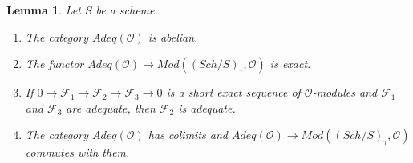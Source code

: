 \documentclass{stacks-project}
\theoremstyle{plain}
\newtheorem{lemma}[subsection]{Lemma}
\theoremstyle{definition}
\theoremstyle{remark}
\numberwithin{equation}{subsection}
\def\Sch{\mathit{Sch}}
\begin{document}
\begin{lemma}
\label{lemma-abelian-adequate}
Let $S$ be a scheme.
\begin{enumerate}
\item The category $\textit{Adeq}(\mathcal{O})$ is abelian.
\item The functor
$\textit{Adeq}(\mathcal{O}) \to
\textit{Mod}((\Sch/S)_\tau, \mathcal{O})$
is exact.
\item If $0 \to \mathcal{F}_1 \to \mathcal{F}_2 \to \mathcal{F}_3 \to 0$
is a short exact sequence of $\mathcal{O}$-modules and
$\mathcal{F}_1$ and $\mathcal{F}_3$ are adequate, then
$\mathcal{F}_2$ is adequate.
\item The category $\textit{Adeq}(\mathcal{O})$ has colimits and
$\textit{Adeq}(\mathcal{O}) \to
\textit{Mod}((\Sch/S)_\tau, \mathcal{O})$
commutes with them.
\end{enumerate}
\end{lemma}
\end{document}
